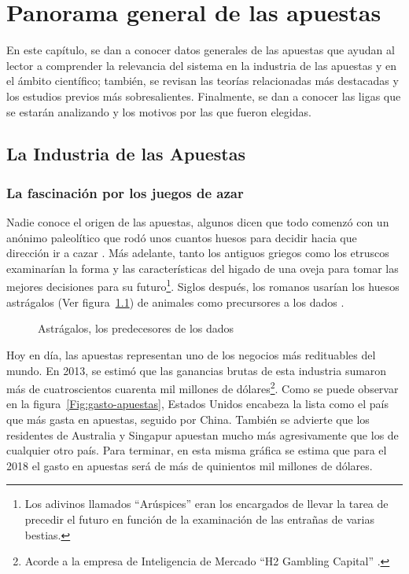 \graphicspath{{/Users/brunomedina/Dropbox/Tesis-Egobets/egobets-notas/resources/marco/}}
\chapter{Panorama general de las apuestas}


En este capítulo, se dan a conocer datos generales de las apuestas que ayudan al lector a comprender la relevancia del sistema en la industria de las apuestas y en el ámbito científico; también, se revisan las teorías relacionadas más destacadas y los estudios previos más sobresalientes. Finalmente, se dan a conocer las ligas que se estarán analizando y los motivos por las que fueron elegidas.

\section{La Industria de las Apuestas}
\subsection{La fascinación por los juegos de azar}

Nadie conoce el origen de las apuestas, algunos dicen que todo comenzó con un anónimo paleolítico que rodó unos cuantos huesos para decidir hacia que dirección ir a cazar \cite{schwartz2013roll}. Más adelante, tanto los antiguos griegos como los etruscos examinarían la forma y las características del higado de una oveja para tomar las mejores decisiones para su futuro\footnote{Los adivinos llamados ``Arúspices'' eran los encargados de llevar la tarea de precedir el futuro en función de la examinación de las entrañas de varias bestias.}. Siglos después, los romanos usarían los huesos astrágalos (Ver figura~\ref{Fig:huesos}) de animales como precursores a los dados \cite{schwartz2013roll}.

\begin{figure}[!htb]\centering
   \begin {minipage}{0.85\textwidth}
     \caption{Astrágalos, los predecesores de los dados}\label{Fig:huesos}
   \end{minipage}
\end{figure}

Hoy en día, las apuestas representan uno de los negocios más redituables del mundo. En 2013, se estimó que las ganancias brutas de esta industria sumaron más de cuatroscientos cuarenta mil millones de dólares\footnote{Acorde a la empresa de Inteligencia de Mercado ``H2 Gambling Capital'' \cite{economistHouseWins}.}. Como se puede observar en la figura~\ref{Fig:gasto-apuestas}, Estados Unidos encabeza la lista como el país que más gasta en apuestas, seguido por China. También se advierte que los residentes de Australia y Singapur apuestan mucho más agresivamente que los de cualquier otro país. Para terminar, en esta misma gráfica se estima que para el 2018 el gasto en apuestas será de más de quinientos mil millones de dólares.



